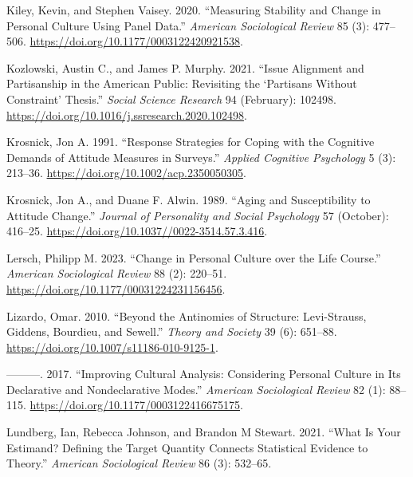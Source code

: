 \documentclass[
  12pt,
]{article}
\newlength{\cslhangindent}
\newlength{\cslentryspacingunit} %
\newenvironment{CSLReferences}[2] %
 {%
  \setlength{\parindent}{0pt}
  \ifodd #1
  \let\oldpar\par
  \def\par{\hangindent=\cslhangindent\oldpar}
  \fi
  \setlength{\parskip}{#2\cslentryspacingunit}
 }%
 {}
\begin{document}
\begin{CSLReferences}{1}{0}
\leavevmode{}%
Kiley, Kevin, and Stephen Vaisey. 2020. {``Measuring {Stability} and {Change} in {Personal} {Culture} {Using} {Panel} {Data}.''} \emph{American Sociological Review} 85 (3): 477--506. \url{https://doi.org/10.1177/0003122420921538}.

\leavevmode{}%
Kozlowski, Austin C., and James P. Murphy. 2021. {``Issue Alignment and Partisanship in the {American} Public: {Revisiting} the {`Partisans Without Constraint'} Thesis.''} \emph{Social Science Research} 94 (February): 102498. \url{https://doi.org/10.1016/j.ssresearch.2020.102498}.

\leavevmode{}%
Krosnick, Jon A. 1991. {``Response Strategies for Coping with the Cognitive Demands of Attitude Measures in Surveys.''} \emph{Applied Cognitive Psychology} 5 (3): 213--36. \url{https://doi.org/10.1002/acp.2350050305}.

\leavevmode{}%
Krosnick, Jon A., and Duane F. Alwin. 1989. {``Aging and {Susceptibility} to {Attitude} {Change}.''} \emph{Journal of Personality and Social Psychology} 57 (October): 416--25. \url{https://doi.org/10.1037//0022-3514.57.3.416}.

\leavevmode{}%
Lersch, Philipp M. 2023. {``Change in {Personal} {Culture} over the {Life} {Course}.''} \emph{American Sociological Review} 88 (2): 220--51. \url{https://doi.org/10.1177/00031224231156456}.

\leavevmode{}%
Lizardo, Omar. 2010. {``Beyond the Antinomies of Structure: {Levi}-{Strauss}, {Giddens}, {Bourdieu}, and {Sewell}.''} \emph{Theory and Society} 39 (6): 651--88. \url{https://doi.org/10.1007/s11186-010-9125-1}.

\leavevmode{}%
---------. 2017. {``Improving {Cultural} {Analysis}: {Considering} {Personal} {Culture} in Its {Declarative} and {Nondeclarative} {Modes}.''} \emph{American Sociological Review} 82 (1): 88--115. \url{https://doi.org/10.1177/0003122416675175}.

\leavevmode{}%
Lundberg, Ian, Rebecca Johnson, and Brandon M Stewart. 2021. {``What {Is} {Your} {Estimand}? {Defining} the {Target} {Quantity} {Connects} {Statistical} {Evidence} to {Theory}.''} \emph{American Sociological Review} 86 (3): 532--65.


\end{CSLReferences}
\end{document}
